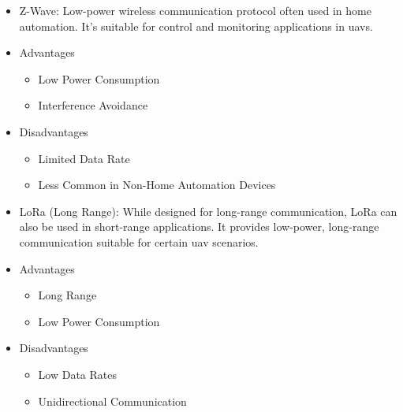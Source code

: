 \begin{itemize}
    \item Z-Wave: Low-power wireless communication protocol often used in home automation. It's suitable for control and monitoring applications in \glspl{uav}.
    \item Advantages
          \begin{itemize}
              \item Low Power Consumption
              \item Interference Avoidance
          \end{itemize}
    \item Disadvantages
          \begin{itemize}
              \item Limited Data Rate
              \item Less Common in Non-Home Automation Devices
          \end{itemize}

    \item LoRa (Long Range): While designed for long-range communication, LoRa can also be used in short-range applications. It provides low-power, long-range communication suitable for certain \gls{uav} scenarios.
    \item Advantages
          \begin{itemize}
              \item Long Range
              \item Low Power Consumption
          \end{itemize}
    \item Disadvantages
          \begin{itemize}
              \item Low Data Rates
              \item Unidirectional Communication
          \end{itemize}
\end{itemize}





